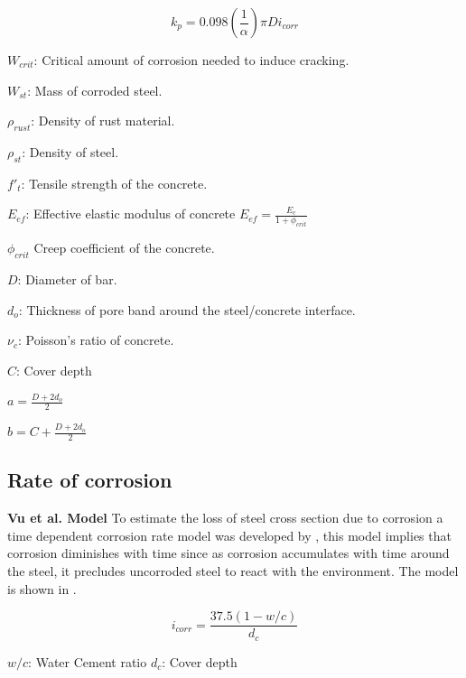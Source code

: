 \begin{equation}
  k_p=0.098 (\frac{1}{\alpha})\pi Di_{corr}
  \label{eq.four}
\end{equation} 

$W_{crit}$: Critical amount of corrosion needed to induce cracking.

$W_{st}$: Mass of corroded steel.

$\rho_{rust}$: Density of rust material.

$\rho_{st}$: Density of steel.

$f'_t$: Tensile strength of the concrete. 

$E_{ef}$: Effective elastic modulus of concrete $E_{ef}=\frac{E_c}{1+\phi_{crit}}$ 

$\phi_{crit}$ Creep coefficient of the concrete.

$D$: Diameter of bar.

$d_o$: Thickness of pore band around the steel/concrete interface.

$\nu_c$: Poisson's ratio of concrete.

$C$: Cover depth

$a=\frac{D+2d_o}{2}$

$b=C+\frac{D+2d_o}{2}$

\subsection{Rate of corrosion}
\:
\textbf{Vu et al. Model }
\:
To estimate the loss of steel cross section due to corrosion a time dependent corrosion rate model was developed by \cite{Vu2000}, this model implies that corrosion diminishes with time since as corrosion accumulates with time around the steel, it precludes uncorroded steel to react with the environment. The model is shown in .

\begin{equation}
  i_{corr}=\frac{37.5(1-w/c)}{d_c}
  \label{eq.five}
\end{equation} 

$w/c$: Water Cement ratio
$d_c$: Cover depth

